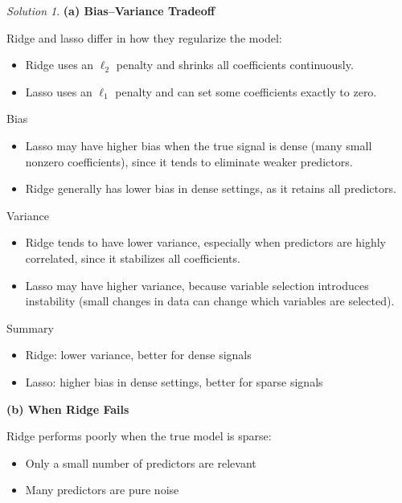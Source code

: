 \documentclass[
  english,
]{article}
\providecommand{\tightlist}{%
  \setlength{\itemsep}{0pt}\setlength{\parskip}{0pt}}
\theoremstyle{definition}
\theoremstyle{definition}
\theoremstyle{remark}
\newtheorem*{solution}{Solution}
\begin{document}
\begin{solution}
\textbf{(a) Bias--Variance Tradeoff}

Ridge and lasso differ in how they regularize the model:

\begin{itemize}
\tightlist
\item
  Ridge uses an \(\ell_2\) penalty and shrinks all coefficients
  continuously.
\item
  Lasso uses an \(\ell_1\) penalty and can set some coefficients exactly
  to zero.
\end{itemize}

Bias

\begin{itemize}
\tightlist
\item
  Lasso may have higher bias when the true signal is dense (many small
  nonzero coefficients), since it tends to eliminate weaker predictors.
\item
  Ridge generally has lower bias in dense settings, as it retains all
  predictors.
\end{itemize}

Variance

\begin{itemize}
\tightlist
\item
  Ridge tends to have lower variance, especially when predictors are
  highly correlated, since it stabilizes all coefficients.
\item
  Lasso may have higher variance, because variable selection introduces
  instability (small changes in data can change which variables are
  selected).
\end{itemize}

Summary

\begin{itemize}
\tightlist
\item
  Ridge: lower variance, better for dense signals
\item
  Lasso: higher bias in dense settings, better for sparse signals
\end{itemize}

\textbf{(b) When Ridge Fails}

Ridge performs poorly when the true model is sparse:

\begin{itemize}
\tightlist
\item
  Only a small number of predictors are relevant
\item
  Many predictors are pure noise
\end{itemize}


\end{solution}
\end{document}
